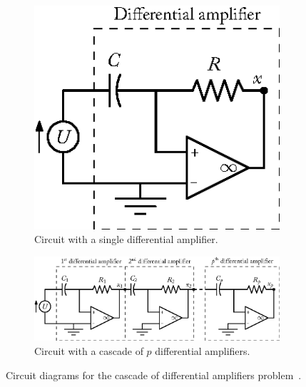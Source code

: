 \begin{figure}[htb]
  \centering
  \begin{subfigure}[t]{0.26\textwidth}
    \centering
    \includegraphics[width=1.0\textwidth]{figures/chapter_5/differential_amplifier_single.eps}
    \caption{Circuit with a single differential amplifier.}
    \label{chap:4:fig:diffamp_single}
  \end{subfigure}%
  \hfill%
  \begin{subfigure}[t]{0.72\textwidth}
    \centering
    \includegraphics[width=1.0\textwidth]{figures/chapter_5/differential_amplifier_cascade.eps}
    \caption{Circuit with a cascade of $p$ differential amplifiers.}
    \label{chap:4:fig:diffamp_cascade}
  \end{subfigure}
  \caption{Circuit diagrams for the cascade of differential amplifiers problem~\cite{brenan1995numerical}.}
  \label{chap:4:fig:diffamp_all}
\end{figure}

